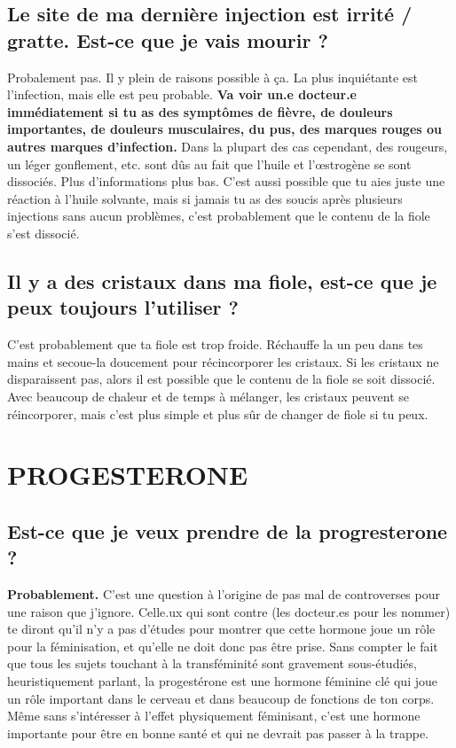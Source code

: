 \documentclass{article}
\begin{document}
\subsection{Le site de ma dernière injection est irrité / gratte. Est-ce que je vais mourir ?}

Probalement pas. Il y plein de raisons possible à ça. La plus inquiétante est l'infection, mais elle est peu probable. \textbf{Va voir un.e docteur.e immédiatement si tu as des symptômes de fièvre, de douleurs importantes, de douleurs musculaires, du pus, des marques rouges ou autres marques d'infection.} Dans la plupart des cas cependant, des rougeurs, un léger gonflement, etc. sont dûs au fait que l'huile et l'œstrogène se sont dissociés. Plus d'informations plus bas. C'est aussi possible que tu aies juste une réaction à l'huile solvante, mais si jamais tu as des soucis après plusieurs injections sans aucun problèmes, c'est probablement que le contenu de la fiole s'est dissocié.

\subsection{Il y a des cristaux dans ma fiole, est-ce que je peux toujours l'utiliser ?}

C'est probablement que ta fiole est trop froide. Réchauffe la un peu dans tes mains et secoue-la doucement pour récincorporer les cristaux. Si les cristaux ne disparaissent pas, alors il est possible que le contenu de la fiole se soit dissocié. Avec beaucoup de chaleur et de temps à mélanger, les cristaux peuvent se réincorporer, mais c'est plus simple et plus sûr de changer de fiole si tu peux.


\section{PROGESTERONE}

\subsection{Est-ce que je veux prendre de la progresterone ?}

\textbf{Probablement.} C'est une question à l'origine de pas mal de controverses pour une raison que j'ignore. Celle.ux qui sont contre (les docteur.es pour les nommer) te diront qu'il n'y a pas d'études pour montrer que cette hormone joue un rôle pour la féminisation, et qu'elle ne doit donc pas être prise. Sans compter le fait que tous les sujets touchant à la transféminité sont gravement sous-étudiés, heuristiquement parlant, la progestérone est une hormone féminine clé qui joue un rôle important dans le cerveau et dans beaucoup de fonctions de ton corps. Même sans s'intéresser à l'effet physiquement féminisant, c'est une hormone importante pour être en bonne santé et qui ne devrait pas passer à la trappe.
\end{document}
